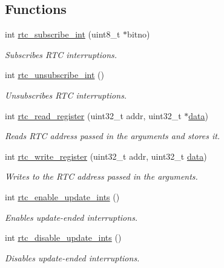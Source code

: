 \subsection*{Functions}
\begin{DoxyCompactItemize}
\item 
int \mbox{\hyperlink{group__rtc_ga7c28e3528db0f743706f9c01608331a7}{rtc\+\_\+subscribe\+\_\+int}} (uint8\+\_\+t $\ast$bitno)
\begin{DoxyCompactList}\small\item\em Subscribes R\+TC interruptions. \end{DoxyCompactList}\item 
int \mbox{\hyperlink{group__rtc_gab8f17bf5280c908c8b199a90fefcc758}{rtc\+\_\+unsubscribe\+\_\+int}} ()
\begin{DoxyCompactList}\small\item\em Unsubscribes R\+TC interruptions. \end{DoxyCompactList}\item 
int \mbox{\hyperlink{group__rtc_gaf6f18245f611a9c8f64055feae5ec73d}{rtc\+\_\+read\+\_\+register}} (uint32\+\_\+t addr, uint32\+\_\+t $\ast$\mbox{\hyperlink{mouse_8c_a325819a8e492ac69542e8b31705af6e9}{data}})
\begin{DoxyCompactList}\small\item\em Reads R\+TC address passed in the arguments and stores it. \end{DoxyCompactList}\item 
int \mbox{\hyperlink{group__rtc_ga9b5d85527d676067a8c05780ec46d4f1}{rtc\+\_\+write\+\_\+register}} (uint32\+\_\+t addr, uint32\+\_\+t \mbox{\hyperlink{mouse_8c_a325819a8e492ac69542e8b31705af6e9}{data}})
\begin{DoxyCompactList}\small\item\em Writes to the R\+TC address passed in the arguments. \end{DoxyCompactList}\item 
int \mbox{\hyperlink{group__rtc_ga33036209deeaa3ca32027fdab0c8b2d7}{rtc\+\_\+enable\+\_\+update\+\_\+ints}} ()
\begin{DoxyCompactList}\small\item\em Enables update-\/ended interruptions. \end{DoxyCompactList}\item 
int \mbox{\hyperlink{group__rtc_ga6222d2da81f961f574c428db117e610e}{rtc\+\_\+disable\+\_\+update\+\_\+ints}} ()
\begin{DoxyCompactList}\small\item\em Disables update-\/ended interruptions. \end{DoxyCompactList}\item 

\end{DoxyCompactItemize}
